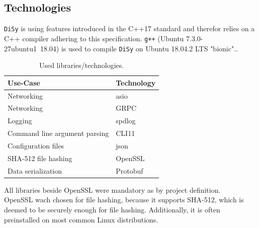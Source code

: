 \documentclass[a4paper]{article}
\begin{document}
\subsection{Technologies}
\texttt{DiSy} is using features introduced in the C++17 standard and therefor relies on a C++ compiler adhering to this specification. \texttt{g++} (Ubuntu 7.3.0-27ubuntu1~18.04) is used to compile \texttt{DiSy} on Ubuntu 18.04.2 LTS "bionic"..

\begin{table}[h]
\centering
\begin{tabular}{l|l}
Use-Case                      & Technology \\ \hline
Networking                    & asio       \\
Networking                    & GRPC       \\
Logging                       & spdlog     \\
Command line argument parsing & CLI11      \\
Configuration files           & json       \\
SHA-512 file hashing          & OpenSSL    \\
Data serialization            & Protobuf
\end{tabular}
\caption{Used libraries/technologies.}
\end{table}

All libraries beside OpenSSL were mandatory as by project definition. \\
OpenSSL wach chosen for file hashing, because it supports SHA-512, which is deemed to be securely enough for file hashing. Additionally, it is often preinstalled on most common Linux distributions.
\end{document}
